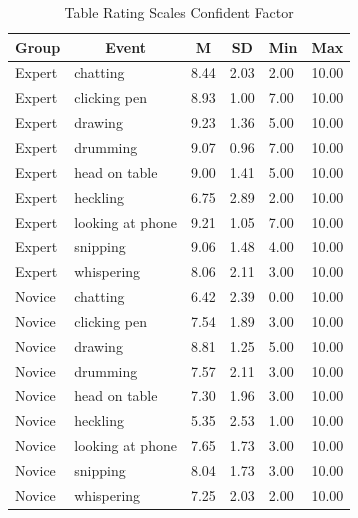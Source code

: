 \documentclass[
  man]{apa6}
\begin{document}
\begin{table}[h]

\begin{center}
\begin{threeparttable}

\caption{\label{tab:rating_scales}Table Rating Scales Confident Factor}

\tiny{

\begin{tabular}{llllll}
\toprule
Group & \multicolumn{1}{c}{Event} & \multicolumn{1}{c}{M} & \multicolumn{1}{c}{SD} & \multicolumn{1}{c}{Min} & \multicolumn{1}{c}{Max}\\
\midrule
Expert & chatting & 8.44 & 2.03 & 2.00 & 10.00\\
Expert & clicking pen & 8.93 & 1.00 & 7.00 & 10.00\\
Expert & drawing & 9.23 & 1.36 & 5.00 & 10.00\\
Expert & drumming & 9.07 & 0.96 & 7.00 & 10.00\\
Expert & head on table & 9.00 & 1.41 & 5.00 & 10.00\\
Expert & heckling & 6.75 & 2.89 & 2.00 & 10.00\\
Expert & looking at phone & 9.21 & 1.05 & 7.00 & 10.00\\
Expert & snipping & 9.06 & 1.48 & 4.00 & 10.00\\
Expert & whispering & 8.06 & 2.11 & 3.00 & 10.00\\
Novice & chatting & 6.42 & 2.39 & 0.00 & 10.00\\
Novice & clicking pen & 7.54 & 1.89 & 3.00 & 10.00\\
Novice & drawing & 8.81 & 1.25 & 5.00 & 10.00\\
Novice & drumming & 7.57 & 2.11 & 3.00 & 10.00\\
Novice & head on table & 7.30 & 1.96 & 3.00 & 10.00\\
Novice & heckling & 5.35 & 2.53 & 1.00 & 10.00\\
Novice & looking at phone & 7.65 & 1.73 & 3.00 & 10.00\\
Novice & snipping & 8.04 & 1.73 & 3.00 & 10.00\\
Novice & whispering & 7.25 & 2.03 & 2.00 & 10.00\\
\bottomrule
\end{tabular}

}

\end{threeparttable}
\end{center}

\end{table}
\end{document}

